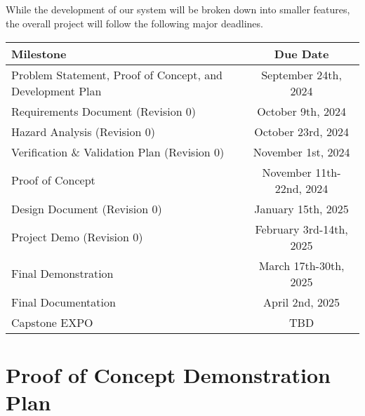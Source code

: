 \documentclass{article}
\begin{document}
\subsection*{\color{red}{Schedule}}
While the development of our system will be broken down into smaller
features, the overall project will follow the following major deadlines.

\begin{center}
  \begin{tabularx}{\textwidth}{Xc}
    \toprule
    \textbf{Milestone} & \textbf{Due Date} \\
    \midrule
    Problem Statement, Proof of Concept, and Development Plan &
    September 24th, 2024 \\
    Requirements Document (Revision 0) & October 9th, 2024 \\
    Hazard Analysis (Revision 0) & October 23rd, 2024 \\
    Verification \& Validation Plan (Revision 0) & November 1st, 2024 \\
    Proof of Concept & November 11th-22nd, 2024 \\
    Design Document (Revision 0) & January 15th, 2025 \\
    Project Demo (Revision 0) & February 3rd-14th, 2025 \\
    Final Demonstration & March 17th-30th, 2025 \\
    Final Documentation & April 2nd, 2025 \\
    Capstone EXPO & TBD \\
    \bottomrule
  \end{tabularx}
\end{center}

\section{Proof of Concept Demonstration Plan}
\end{document}
